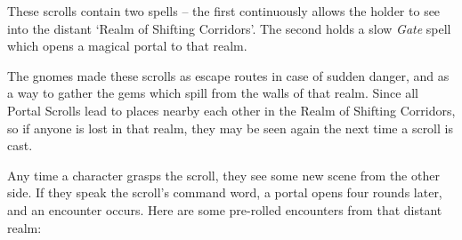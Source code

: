 \begin{multicols}{2}
These scrolls contain two spells -- the first continuously allows the holder to see into the distant `Realm of Shifting Corridors'.%
The second holds a slow \textit{Gate} spell
which opens a magical portal to that realm.

The gnomes made these scrolls as escape routes in case of sudden danger, and as a way to gather the gems which spill from the walls of that realm.
Since all Portal Scrolls lead to places nearby each other in the Realm of Shifting Corridors, so if anyone is lost in that realm, they may be seen again the next time a scroll is cast.

Any time a character grasps the scroll, they see some new scene from the other side.
If they speak the scroll's command word, a portal opens four rounds later, and an encounter occurs.
Here are some pre-rolled encounters from that distant realm:

\needspace{4em}
\begin{itemize}


\end{itemize}
\end{multicols}
